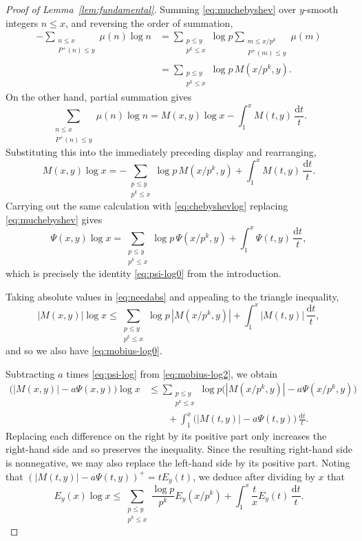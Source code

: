 \documentclass[11pt]{amsart}
\theoremstyle{remark}
\newcommand{\dt}{\,\frac{\mathrm{d}t}{t}}
\begin{document}
\begin{proof}[Proof of Lemma~\ref{lem:fundamental}]
Summing \eqref{eq:muchebyshev} over $y$-smooth integers $n\le x$, and reversing the order of summation,
\[
\begin{aligned}
-\sum_{\substack{n\le x\\P^+(n)\le y}}\mu(n)\log n
&=\sum_{\substack{p\le y\\p^k\le x}}\log p
  \sum_{\substack{m\le x/p^k\\P^+(m)\le y}}\mu(m)\\
&=\sum_{\substack{p\le y\\p^k\le x}}\log p\,M(x/p^k,y).
\end{aligned}
\]
On the other hand, partial summation gives
\[
\sum_{\substack{n\le x\\P^+(n)\le y}}\mu(n)\log n
=M(x,y)\log x-\int_1^xM(t,y)\dt.
\]
Substituting this into the immediately preceding display and rearranging,
\begin{equation}\label{eq:needabs}
M(x,y)\log x
=-\sum_{\substack{p\le y\\p^k\le x}}\log p\,M(x/p^k,y)
 +\int_1^xM(t,y)\dt.
\end{equation}
Carrying out the same calculation with \eqref{eq:chebyshevlog} replacing \eqref{eq:muchebyshev} gives
\begin{equation}\label{eq:psi-log}
\Psi(x,y)\log x
=\sum_{\substack{p\le y\\p^k\le x}}\log p\,\Psi(x/p^k,y)
 +\int_1^x\Psi(t,y)\dt,
\end{equation}
which is precisely the identity \eqref{eq:psi-log0} from the introduction.

Taking absolute values in \eqref{eq:needabs} and appealing to the triangle inequality,
\begin{equation}\label{eq:mobius-log2}
|M(x,y)|\log x
\le \sum_{\substack{p\le y\\p^k\le x}}\log p\,|M(x/p^k,y)|
 +\int_1^x |M(t,y)|\dt,
\end{equation}
and so we also have \eqref{eq:mobius-log0}. 

Subtracting $a$ times \eqref{eq:psi-log} from \eqref{eq:mobius-log2}, we obtain
\begin{align*}
\bigl(|M(x,y)|-a\Psi(x,y)\bigr)\log x
&\le\sum_{\substack{p\le y\\p^k\le x}}\log p
 \bigl(|M(x/p^k,y)|-a\Psi(x/p^k,y)\bigr)\\
&\qquad+\int_1^x\bigl(|M(t,y)|-a\Psi(t,y)\bigr)\dt.
\end{align*}
Replacing each difference on the right by its positive part only
increases the right-hand side and so preserves the inequality. Since the resulting right-hand side is nonnegative, we may also replace the left-hand side by its positive part. Noting that $(|M(t,y)|-a\Psi(t,y))^+=tE_y(t)$, we deduce after dividing by $x$ that
\begin{equation}\label{eq:excess-inequality}
E_y(x)\log x
\le\sum_{\substack{p\le y\\p^k\le x}}
 \frac{\log p}{p^k}E_y(x/p^k)
 +\int_1^x\frac tx E_y(t)\dt.
\end{equation}


\end{proof}
\end{document}
